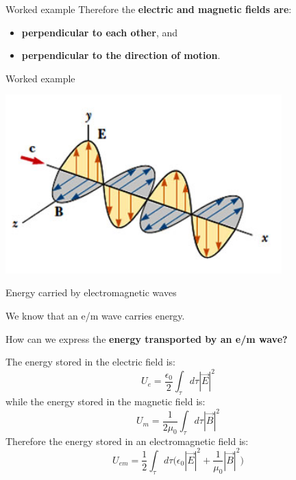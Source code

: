 {\begin{frame}{Worked example}
Therefore the {\bf electric and magnetic fields are}:
\begin{itemize}
    \item {\bf perpendicular to each other}, and
    \item {\bf perpendicular to the direction of motion}.
\end{itemize}

\end{frame}

%
%
%
%

\begin{frame}{Worked example}

\begin{center}
\includegraphics[width=0.80\textwidth]{./images/schematics/emwave_01.jpg}\\
\end{center}

\end{frame}

} %


%
%
%
%

\begin{frame}{Energy carried by electromagnetic waves}

We know that an e/m wave carries energy.\\
\vspace{0.1cm}

How can we express the {\bf energy transported by an e/m wave?}\\
\vspace{0.2cm}

The energy stored in the electric field is:
\begin{equation*}
  U_{e} = \frac{\epsilon_0}{2} \int_{\tau} d\tau |\vec{E}|^2
\end{equation*}
while the energy stored in the magnetic field is:
\begin{equation*}
  U_{m} = \frac{1}{2\mu_0} \int_{\tau} d\tau |\vec{B}|^2
\end{equation*}
Therefore the energy stored in an electromagnetic field is:
\begin{equation*}
  U_{em} = \frac{1}{2} \int_{\tau} d\tau \Big( \epsilon_0 |\vec{E}|^2 + \frac{1}{\mu_0} |\vec{B}|^2 \Big)
\end{equation*}

\end{frame}

